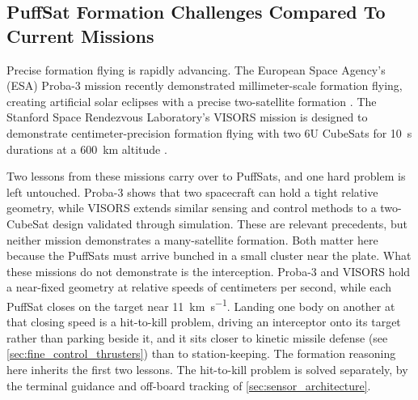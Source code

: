 \documentclass{article}
\begin{document}
\subsection{PuffSat Formation Challenges Compared To Current Missions}\label{sec:formation_challenges_current_missions}
Precise formation flying is rapidly advancing. The European Space Agency's (ESA) Proba-3 mission recently demonstrated millimeter-scale formation flying, creating artificial solar eclipses with a precise two-satellite formation \cite{llorente2013proba3,zhukov2025proba3aspiics}. The Stanford Space Rendezvous Laboratory's VISORS mission is designed to demonstrate centimeter-precision formation flying with two 6U CubeSats for \SI{10}{\second} durations at a \SI{600}{\kilo\meter} altitude \cite{guffanti2023autonomous,visors_formation_flying}.

Two lessons from these missions carry over to PuffSats, and one hard problem is left untouched. Proba-3 shows that two spacecraft can hold a tight relative geometry, while VISORS extends similar sensing and control methods to a two-CubeSat design validated through simulation. These are relevant precedents, but neither mission demonstrates a many-satellite formation. Both matter here because the PuffSats must arrive bunched in a small cluster near the plate. What these missions do not demonstrate is the interception. Proba-3 and VISORS hold a near-fixed geometry at relative speeds of centimeters per second, while each PuffSat closes on the target near \SI{11}{\kilo\meter\per\second}. Landing one body on another at that closing speed is a hit-to-kill problem, driving an interceptor onto its target rather than parking beside it, and it sits closer to kinetic missile defense (see \autoref{sec:fine_control_thrusters}) than to station-keeping. The formation reasoning here inherits the first two lessons.  The hit-to-kill problem is solved separately, by the terminal guidance and off-board tracking of \autoref{sec:sensor_architecture}.
\end{document}
